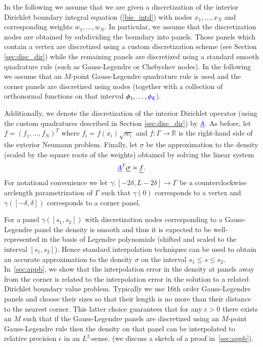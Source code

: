 In the following we assume that we are given a discretization of the interior Dirichlet boundary integral equation (\ref{bie_intd}) with nodes $x_1,\dots,x_N$ and corresponding weights $w_1,\dots,w_N.$ In particular, we assume that the discretization nodes are obtained by subdividing the boundary into panels. Those panels which contain a vertex are discretized using a custom discretization scheme (see Section \ref{sec:disc_dir}) while the remaining panels are discretized using a standard smooth quadrature rule (such as Gauss-Legendre or Chebyshev nodes). In the following we assume that an $M$-point Gauss-Legendre quadrature rule is used and the corner panels are discretized using  nodes (together with a collection of orthonormal functions on that interval $\phi_1,\dots,{\color{blue} \phi_K}$).

Additionally, we denote the discretization of the interior Dirichlet operator (using the custom quadratures described in Section \ref{sec:disc_dir}) by ${\color{blue} \underline{A}}.$ As before, let $\underline{f} = (f_1,\dots,f_N)^T$ where $f_i = f(x_i) \sqrt{w_i}$ and $f: \Gamma \to \mathbb{R}$ is the right-hand side of the exterior Neumann problem. Finally, let $\underline{\sigma}$ be the approximation to the density (scaled by the square roots of the weights) obtained by solving the linear system
\begin{align}\label{eqn:adj_linalg}
{\color{blue} \underline{A}}^T \underline{\sigma} = \underline{f}.
\end{align}
For notational convenience we let $\gamma:[-2\delta,L-2\delta] \to \Gamma$ be a counterclockwise arclength parametrization of $\Gamma$ such that  $\gamma(0)$ corresponds to a vertex and $\gamma([-\delta,\delta])$ corresponds to a corner panel.

For a panel $\gamma([s_1,s_2])$ with discretization nodes  corresponding to a Gauss-Legendre panel the density is smooth and thus it is expected to be well-represented in the basis of Legendre polynomials (shifted and scaled to the interval $[s_1,s_2]$). Hence standard interpolation techniques can be used to obtain an accurate approximation to the density $\sigma$ on the interval $s_1 \le s\le s_2.$ In~\cref{sec:appb}, we show that the interpolation error in the density
at panels away from the corner is related to the interpolation error in the solution to a related Dirichlet boundary value problem.
{\color{red}
Typically we use 16th order Gauss-Legendre panels and choose their sizes so that their length is no more than their distance to the nearest corner. This latter choice guarantees that for any $\epsilon>0$ there exists an $M$ such that if the Gauss-Legendre panels are discretized using an $M$-point Gauss-Legendre rule then the density on that panel can be interpolated to relative precision $\epsilon$ in an $L^2$-sense.
(we discuss a sketch of a proof in~\cref{sec:appb})}.


